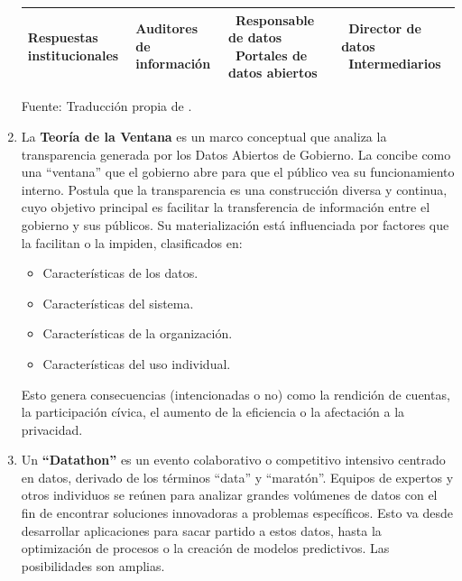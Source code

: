 \begin{enumerate}
\begin{table}[htbp]
{\begin{tabular}{|p{}|p{}|p{}|p{}|}
				\hline
				\textbf{Respuestas institucionales} & Auditores de información &
				\textbullet~Responsable de datos \newline
				\textbullet~Portales de datos abiertos
				&
				\textbullet~Director de datos \newline
				\textbullet~Intermediarios \\
				\hline
			\end{tabular}
		}
		\vspace{0.5em}
		\footnotesize Fuente: Traducción propia de \cite{verhulst2020}.
	\end{table}

	\item La \textbf{Teoría de la Ventana} \label{def6} \citep{Matheus03052020} es un marco conceptual que analiza la transparencia generada por los Datos Abiertos de Gobierno. La concibe como una ``ventana'' que el gobierno abre para que el público vea su funcionamiento interno. Postula que la transparencia es una construcción diversa y continua, cuyo objetivo principal es facilitar la transferencia de información entre el gobierno y sus públicos. Su materialización está influenciada por factores que la facilitan o la impiden, clasificados en:
	\begin{itemize}
		\item Características de los datos.
		\item Características del sistema.
		\item Características de la organización.
		\item Características del uso individual.
	\end{itemize}
	Esto genera consecuencias (intencionadas o no) como la rendición de cuentas, la participación cívica, el aumento de la eficiencia o la afectación a la privacidad. \\

	\item Un \textbf{``Datathon''} \label{def7} \citep{Datathon2016Anslow} es un evento colaborativo o competitivo intensivo centrado en datos, derivado de los términos ``data'' y ``maratón''. Equipos de expertos y otros individuos se reúnen para analizar grandes volúmenes de datos con el fin de encontrar soluciones innovadoras a problemas específicos. Esto va desde desarrollar aplicaciones para sacar partido a estos datos, hasta la optimización de procesos o la creación de modelos predictivos. Las posibilidades son amplias.


\end{enumerate}
